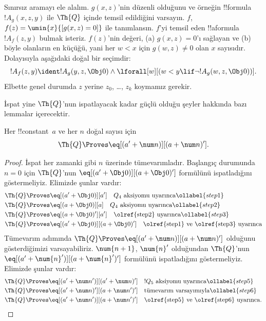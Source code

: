 \documentclass[../../../include/open-logic-section]{subfiles}
\begin{document}

Sınırsız aramayı ele alalım. $g(x,z)$'nin düzenli olduğunu ve örneğin
!!{formula}~$!A_g(x,z,y)$ ile $\Th{Q}$ içinde temsil edildiğini varsayın.
$f$, $f(z)=\umin{x}{[g(x,z)=0]}$ ile tanımlansın. $f$'yi temsil eden
!!a{formula}~$!A_f(z,y)$ bulmak isteriz. $f(z)$'nin değeri, (a)
$g(x,z)=0$'ı sağlayan ve (b) böyle olanların en küçüğü, yani her $w<x$
için $g(w,z)\neq0$ olan $x$ sayısıdır. Dolayısıyla aşağıdaki doğal bir
seçimdir:
\[
!A_f(z,y) \ident !A_g(y, z, \Obj 0) \land \lforall[w][(w < y \lif \lnot
  !A_g(w, z, \Obj 0))].
\]
Elbette genel durumda $z$ yerine $z_0$, \dots, $z_k$ koymamız gerekir.

İspat yine $\Th{Q}$'nun ispatlayacak kadar güçlü olduğu şeyler hakkında
bazı lemmalar içerecektir.

\begin{lem}
 Her !!{constant}~$a$ ve her $n$ doğal sayısı için
\[
\Th{Q} \Proves \eq[(a' + \num n)][(a + \num n)'].
\]
\end{lem}

\begin{proof}
İspat her zamanki gibi $n$ üzerinde tümevarımladır. Başlangıç durumunda
$n=0$ için $\Th{Q}$'nun $\eq[(a'+\Obj 0)][(a+\Obj 0)']$ formülünü
ispatladığını göstermeliyiz. Elimizde şunlar vardır:
\begin{align}
  \Th{Q} & \Proves \eq[(a' + \Obj 0)][a'] \quad \text{$Q_4$ aksiyomu uyarınca}
  \ollabel{step1}\\
  \Th{Q} & \Proves  \eq[(a + \Obj 0)][a] \quad \text{$Q_4$ aksiyomu uyarınca}
  \ollabel{step2} \\
  \Th{Q} & \Proves \eq[(a + \Obj 0)'][a'] \quad \text{\olref{step2} uyarınca}
  \ollabel{step3} \\
  \Th{Q} & \Proves \eq[(a' + \Obj 0)][(a + \Obj 0)'] \quad
  \text{\olref{step1} ve \olref{step3} uyarınca}\notag
\end{align}
Tümevarım adımında $\Th{Q} \Proves
\eq[(a'+\num n)][(a+\num n)']$ olduğunu gösterdiğimizi varsayabiliriz.
$\num{n+1}$, $\num{n}'$ olduğundan $\Th{Q}$'nun
$\eq[(a'+\num{n}')][(a+\num{n}')']$ formülünü ispatladığını göstermeliyiz.
Elimizde şunlar vardır:
\begin{align}
  \Th{Q} & \Proves \eq[(a' + \num n')][(a' + \num n)'] \quad
  \text{$!Q_5$ aksiyomu uyarınca} \ollabel{step5}\\
  \Th{Q} & \Proves \eq[(a' + \num n)'][(a + \num n')'] \quad
  \text{tümevarım varsayımıyla} \ollabel{step6}\\
  \Th{Q} & \Proves \eq[(a' + \num n')][(a + \num n')'] \quad
  \text{\olref{step5} ve \olref{step6} uyarınca.} \notag
\end{align}
\end{proof}
\end{document}

